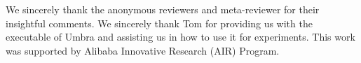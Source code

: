 \begin{acks}
    We sincerely thank the anonymous reviewers and meta-reviewer for their insightful comments.
    We sincerely thank Tom for providing us with the executable of Umbra and assisting us in how to use it for experiments.
    This work was supported by Alibaba Innovative Research (AIR) Program.
\end{acks}